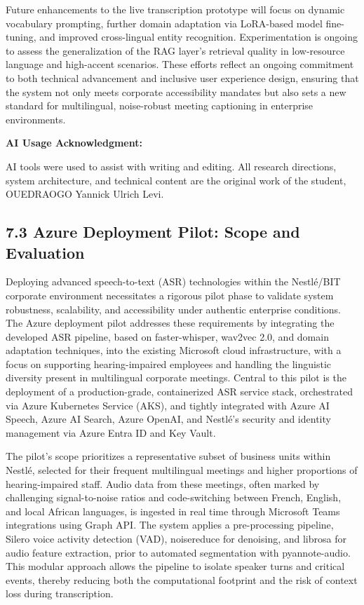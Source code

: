 \documentclass[12pt,a4paper]{article}
\begin{document}
Future enhancements to the live transcription prototype will focus on dynamic vocabulary prompting, further domain adaptation via LoRA-based model fine-tuning, and improved cross-lingual entity recognition. Experimentation is ongoing to assess the generalization of the RAG layer’s retrieval quality in low-resource language and high-accent scenarios. These efforts reflect an ongoing commitment to both technical advancement and inclusive user experience design, ensuring that the system not only meets corporate accessibility mandates but also sets a new standard for multilingual, noise-robust meeting captioning in enterprise environments.


\textbf{AI Usage Acknowledgment:}

AI tools were used to assist with writing and editing. All research directions, system architecture, and technical content are the original work of the student, OUEDRAOGO Yannick Ulrich Levi.


\subsection{7.3 Azure Deployment Pilot: Scope and Evaluation}


Deploying advanced speech-to-text (ASR) technologies within the Nestlé/BIT corporate environment necessitates a rigorous pilot phase to validate system robustness, scalability, and accessibility under authentic enterprise conditions. The Azure deployment pilot addresses these requirements by integrating the developed ASR pipeline, based on faster-whisper, wav2vec 2.0, and domain adaptation techniques, into the existing Microsoft cloud infrastructure, with a focus on supporting hearing-impaired employees and handling the linguistic diversity present in multilingual corporate meetings. Central to this pilot is the deployment of a production-grade, containerized ASR service stack, orchestrated via Azure Kubernetes Service (AKS), and tightly integrated with Azure AI Speech, Azure AI Search, Azure OpenAI, and Nestlé’s security and identity management via Azure Entra ID and Key Vault.


The pilot’s scope prioritizes a representative subset of business units within Nestlé, selected for their frequent multilingual meetings and higher proportions of hearing-impaired staff. Audio data from these meetings, often marked by challenging signal-to-noise ratios and code-switching between French, English, and local African languages, is ingested in real time through Microsoft Teams integrations using Graph API. The system applies a pre-processing pipeline, Silero voice activity detection (VAD), noisereduce for denoising, and librosa for audio feature extraction, prior to automated segmentation with pyannote-audio. This modular approach allows the pipeline to isolate speaker turns and critical events, thereby reducing both the computational footprint and the risk of context loss during transcription.
\end{document}
